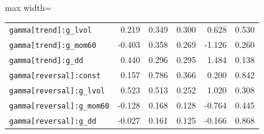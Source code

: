 \begin{table}[!htbp]
\begin{adjustbox}{max width=\textwidth}
\begin{tabular}{lrrrrr}
\texttt{gamma[trend]:g\_lvol} & 0.219 & 0.349 & 0.300 & 0.628 & 0.530\\
\texttt{gamma[trend]:g\_mom60} & -0.403 & 0.358 & 0.269 & -1.126 & 0.260\\
\texttt{gamma[trend]:g\_dd} & 0.440 & 0.296 & 0.295 & 1.484 & 0.138\\
\texttt{gamma[reversal]:const} & 0.157 & 0.786 & 0.366 & 0.200 & 0.842\\
\texttt{gamma[reversal]:g\_lvol} & 0.523 & 0.513 & 0.252 & 1.020 & 0.308\\
\texttt{gamma[reversal]:g\_mom60} & -0.128 & 0.168 & 0.128 & -0.764 & 0.445\\
\texttt{gamma[reversal]:g\_dd} & -0.027 & 0.161 & 0.125 & -0.166 & 0.868\\
\bottomrule
\end{tabular}
\end{adjustbox}
\end{table}